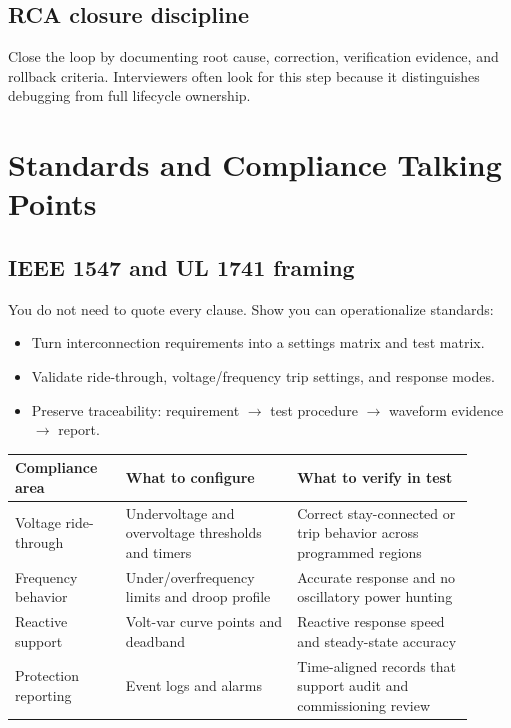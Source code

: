 \documentclass[11pt]{article}
\begin{document}
\subsection{RCA closure discipline}
Close the loop by documenting root cause, correction, verification evidence,
and rollback criteria. Interviewers often look for this step because it
distinguishes debugging from full lifecycle ownership.

\section{Standards and Compliance Talking Points}

\subsection{IEEE 1547 and UL 1741 framing}
You do not need to quote every clause. Show you can operationalize standards:
\begin{itemize}
  \item Turn interconnection requirements into a settings matrix and test matrix.
  \item Validate ride-through, voltage/frequency trip settings, and response modes.
  \item Preserve traceability: requirement $\rightarrow$ test procedure $\rightarrow$ waveform evidence $\rightarrow$ report.
\end{itemize}

\begin{table}[h]
\centering
\begin{tabular}{p{0.22\linewidth}p{0.34\linewidth}p{0.35\linewidth}}
\toprule
Compliance area & What to configure & What to verify in test \\
\midrule
Voltage ride-through & Undervoltage and overvoltage thresholds and timers & Correct stay-connected or trip behavior across programmed regions \\
Frequency behavior & Under/overfrequency limits and droop profile & Accurate response and no oscillatory power hunting \\
Reactive support & Volt-var curve points and deadband & Reactive response speed and steady-state accuracy \\
Protection reporting & Event logs and alarms & Time-aligned records that support audit and commissioning review \\
\bottomrule
\end{tabular}
\end{table}
\end{document}
